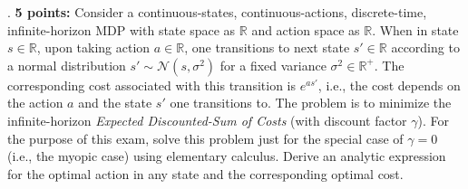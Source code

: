 \documentclass[12pt]{exam}
\begin{document}
\begin{questions}
\begin{itemize}
\end{itemize}

. {\bf 5 points:} Consider a continuous-states, continuous-actions, discrete-time, infinite-horizon MDP with state space as $\mathbb{R}$ and action space as $\mathbb{R}$. When in state $s\in \mathbb{R}$, upon taking action $a\in \mathbb{R}$, one transitions to next state $s' \in \mathbb{R}$ according to a normal distribution $s' \sim \mathcal{N}(s, \sigma^2)$ for a fixed variance $\sigma^2 \in \mathbb{R}^+$. The corresponding cost associated with this transition is $e^{as'}$, i.e., the cost depends on the action $a$ and the state $s'$ one transitions to. The problem is to minimize the  infinite-horizon {\em Expected Discounted-Sum of Costs} (with discount factor $\gamma$). For the purpose of this exam, solve this problem just for the special case of $\gamma = 0$ (i.e., the myopic case) using elementary calculus. Derive an analytic expression for the optimal action in any state and the corresponding optimal cost.

 
\end{questions}
\end{document}
